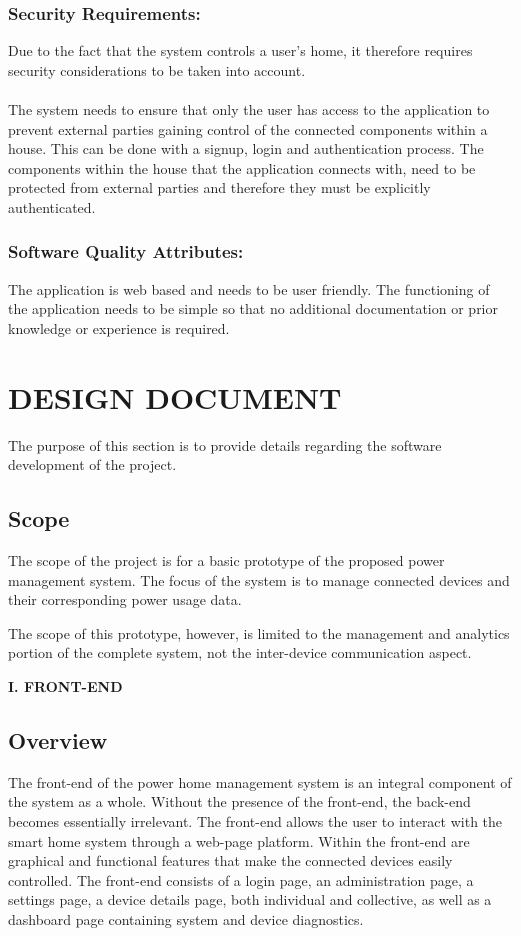 \documentclass[10pt,twocolumn]{witseiepaper}
\begin{document}
	\subsubsection{Security Requirements:}
	Due to the fact that the system controls a user's home, it therefore requires security considerations to be taken into account.
	\\\\
	The system needs to ensure that only the user has access to the application to prevent external parties gaining control of the connected components within a house. This can be done with a signup, login and authentication process. 
	The components within the house that the application connects with, need to be protected from external parties and therefore they must be explicitly authenticated. 
	
	\subsubsection{Software Quality Attributes:}
	The application is web based and needs to be user friendly. The functioning of the application needs to be simple so that no additional documentation or prior knowledge or experience is required. 
	
	\section{DESIGN DOCUMENT}
	
	The purpose of this section is to provide details regarding the software development of the project. 
	
	\subsection{Scope}
	The scope of the project is for a basic prototype of the proposed power management system. The focus of the system is to manage connected devices and their corresponding power usage data. 
	
	The scope of this prototype, however, is limited to the management and analytics portion of the complete system, not the inter-device communication aspect. 
	
	\begin{center}
		\textbf{I. FRONT-END}
	\end{center}
	
	\subsection{Overview}
	The front-end of the power home management system is an integral component of the system as a whole. Without the presence of the front-end, the back-end becomes essentially irrelevant. The front-end allows the user to interact with the smart home system through a web-page platform. Within the front-end are graphical and functional features that make the connected devices easily controlled. The front-end consists of a login page, an administration page, a settings page, a device details page, both individual and collective, as well as a dashboard page containing system and device diagnostics.
	
\end{document}
